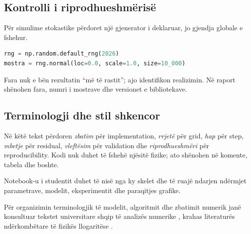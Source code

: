 \subsection{Kontrolli i riprodhueshmërisë}
Për simulime stokastike përdoret një gjenerator i deklaruar, jo gjendja globale e fshehur.
\begin{lstlisting}[language=Python]
rng = np.random.default_rng(2026)
mostra = rng.normal(loc=0.0, scale=1.0, size=10_000)
\end{lstlisting}
Fara nuk e bën rezultatin ``më të rastit''; ajo identifikon realizimin. Në raport shënohen fara, numri i mostrave dhe versionet e bibliotekave.

\subsection{Terminologji dhe stil shkencor}
Në këtë tekst përdoren \emph{zbatim} për implementation, \emph{rrjetë} për grid, \emph{hap} për step, \emph{mbetje} për residual, \emph{vleftësim} për validation dhe \emph{riprodhueshmëri} për reproducibility. Kodi nuk duhet të fshehë njësitë fizike; ato shënohen në komente, tabela dhe boshte.

\begin{lidhje}
Notebook-u i studentit duhet të nisë nga ky skelet dhe të ruajë ndarjen ndërmjet parametrave, modelit, eksperimentit dhe paraqitjes grafike.
\end{lidhje}

Për organizimin terminologjik të modelit, algoritmit dhe zbatimit numerik janë konsultuar tekstet universitare shqip të analizës numerike \cite{hanelli,hoxha,datja}, krahas literaturës ndërkombëtare të fizikës llogaritëse \cite{newman,landau}.
